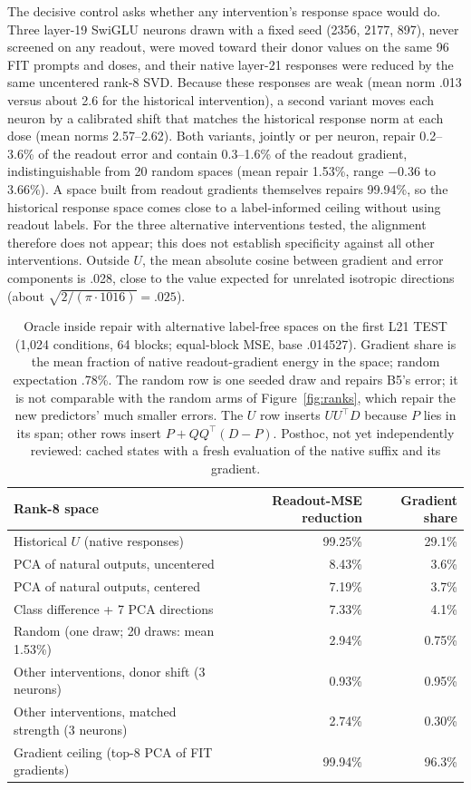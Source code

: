 \documentclass[11pt]{article}
\begin{document}
The decisive control asks whether any intervention's response space would do. Three layer-19 SwiGLU neurons drawn with a fixed seed (2356, 2177, 897), never screened on any readout, were moved toward their donor values on the same 96 FIT prompts and doses, and their native layer-21 responses were reduced by the same uncentered rank-8 SVD. Because these responses are weak (mean norm .013 versus about 2.6 for the historical intervention), a second variant moves each neuron by a calibrated shift that matches the historical response norm at each dose (mean norms 2.57--2.62). Both variants, jointly or per neuron, repair 0.2--3.6\% of the readout error and contain 0.3--1.6\% of the readout gradient, indistinguishable from 20 random spaces (mean repair 1.53\%, range $-0.36$ to 3.66\%). A space built from readout gradients themselves repairs 99.94\%, so the historical response space comes close to a label-informed ceiling without using readout labels. For the three alternative interventions tested, the alignment therefore does not appear; this does not establish specificity against all other interventions. Outside $U$, the mean absolute cosine between gradient and error components is .028, close to the value expected for unrelated isotropic directions (about $\sqrt{2/(\pi\cdot1016)}=.025$).

\begin{table}[ht]\centering\small
\begin{tabular}{lrr}\toprule Rank-8 space & Readout-MSE reduction & Gradient share\\\midrule
Historical $U$ (native responses) & 99.25\% & 29.1\%\\
PCA of natural outputs, uncentered & 8.43\% & 3.6\%\\
PCA of natural outputs, centered & 7.19\% & 3.7\%\\
Class difference + 7 PCA directions & 7.33\% & 4.1\%\\
Random (one draw; 20 draws: mean 1.53\%) & 2.94\% & 0.75\%\\
Other interventions, donor shift (3 neurons) & 0.93\% & 0.95\%\\
Other interventions, matched strength (3 neurons) & 2.74\% & 0.30\%\\
Gradient ceiling (top-8 PCA of FIT gradients) & 99.94\% & 96.3\%\\\bottomrule\end{tabular}
\caption{Oracle inside repair with alternative label-free spaces on the first L21 TEST (1,024 conditions, 64 blocks; equal-block MSE, base .014527). Gradient share is the mean fraction of native readout-gradient energy in the space; random expectation .78\%. The random row is one seeded draw and repairs B5's error; it is not comparable with the random arms of Figure~\ref{fig:ranks}, which repair the new predictors' much smaller errors. The $U$ row inserts $UU^\top D$ because $P$ lies in its span; other rows insert $P+QQ^\top(D-P)$. Posthoc, not yet independently reviewed: cached states with a fresh evaluation of the native suffix and its gradient.}\label{tab:spaces}
\end{table}
\end{document}
